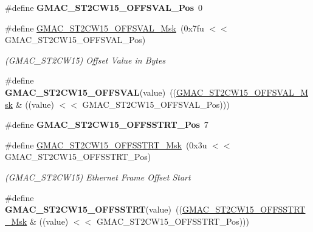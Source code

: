 \begin{DoxyCompactItemize}
\item 
\mbox{\label{group__SAME70__GMAC_ga30bc89015657482d5c6054cb8b2a2e8f}} 
\#define {\bfseries G\+M\+A\+C\+\_\+\+S\+T2\+C\+W15\+\_\+\+O\+F\+F\+S\+V\+A\+L\+\_\+\+Pos}~0
\item 
\mbox{\label{group__SAME70__GMAC_ga5568bdd3e5c39c5a07148b3a4f238568}} 
\#define \mbox{\hyperlink{group__SAME70__GMAC_ga5568bdd3e5c39c5a07148b3a4f238568}{G\+M\+A\+C\+\_\+\+S\+T2\+C\+W15\+\_\+\+O\+F\+F\+S\+V\+A\+L\+\_\+\+Msk}}~(0x7fu $<$$<$ G\+M\+A\+C\+\_\+\+S\+T2\+C\+W15\+\_\+\+O\+F\+F\+S\+V\+A\+L\+\_\+\+Pos)
\begin{DoxyCompactList}\small\item\em (G\+M\+A\+C\+\_\+\+S\+T2\+C\+W15) Offset Value in Bytes \end{DoxyCompactList}\item 
\mbox{\label{group__SAME70__GMAC_gafe6080dd5deafe1e086e799ff0567f43}} 
\#define {\bfseries G\+M\+A\+C\+\_\+\+S\+T2\+C\+W15\+\_\+\+O\+F\+F\+S\+V\+AL}(value)~((\mbox{\hyperlink{group__SAMV71__GMAC_ga5568bdd3e5c39c5a07148b3a4f238568}{G\+M\+A\+C\+\_\+\+S\+T2\+C\+W15\+\_\+\+O\+F\+F\+S\+V\+A\+L\+\_\+\+Msk}} \& ((value) $<$$<$ G\+M\+A\+C\+\_\+\+S\+T2\+C\+W15\+\_\+\+O\+F\+F\+S\+V\+A\+L\+\_\+\+Pos)))
\item 
\mbox{\label{group__SAME70__GMAC_gaaf7e7377f5f9e44d38973bad2f6080d8}} 
\#define {\bfseries G\+M\+A\+C\+\_\+\+S\+T2\+C\+W15\+\_\+\+O\+F\+F\+S\+S\+T\+R\+T\+\_\+\+Pos}~7
\item 
\mbox{\label{group__SAME70__GMAC_ga09278b6f0c333c3f9c7e93be55b01f5f}} 
\#define \mbox{\hyperlink{group__SAME70__GMAC_ga09278b6f0c333c3f9c7e93be55b01f5f}{G\+M\+A\+C\+\_\+\+S\+T2\+C\+W15\+\_\+\+O\+F\+F\+S\+S\+T\+R\+T\+\_\+\+Msk}}~(0x3u $<$$<$ G\+M\+A\+C\+\_\+\+S\+T2\+C\+W15\+\_\+\+O\+F\+F\+S\+S\+T\+R\+T\+\_\+\+Pos)
\begin{DoxyCompactList}\small\item\em (G\+M\+A\+C\+\_\+\+S\+T2\+C\+W15) Ethernet Frame Offset Start \end{DoxyCompactList}\item 
\mbox{\label{group__SAME70__GMAC_gacd8d140181d45eec7918c46a8eb2dc01}} 
\#define {\bfseries G\+M\+A\+C\+\_\+\+S\+T2\+C\+W15\+\_\+\+O\+F\+F\+S\+S\+T\+RT}(value)~((\mbox{\hyperlink{group__SAMV71__GMAC_ga09278b6f0c333c3f9c7e93be55b01f5f}{G\+M\+A\+C\+\_\+\+S\+T2\+C\+W15\+\_\+\+O\+F\+F\+S\+S\+T\+R\+T\+\_\+\+Msk}} \& ((value) $<$$<$ G\+M\+A\+C\+\_\+\+S\+T2\+C\+W15\+\_\+\+O\+F\+F\+S\+S\+T\+R\+T\+\_\+\+Pos)))

\end{DoxyCompactItemize}
